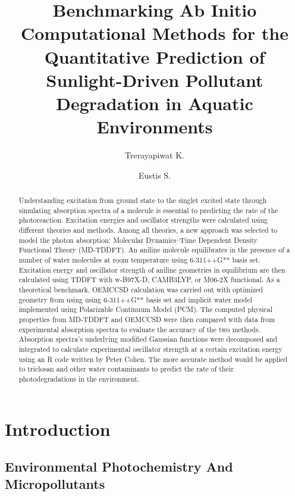 \documentclass[
journal=jpcbfk, %
manuscript=article]{achemso}
\author{Trerayapiwat K.}
\affiliation[Bowdoin College]
{Department of Chemistry, Bowdoin College, Brunswick, ME}
\author{Eustis S.}
\affiliation[Bowdoin College]
{Department of Chemistry, Bowdoin College, Brunswick, ME}
\title[\texttt{achemso} demonstration]
{Benchmarking Ab Initio Computational Methods for the Quantitative Prediction of Sunlight-Driven Pollutant Degradation in Aquatic Environments}
\begin{document}
\begin{abstract}
Understanding excitation from ground state to the singlet excited state through simulating absorption spectra of a molecule is essential to predicting the rate of the photoreaction. Excitation energies and oscillator strengths were calculated using different theories and methods. Among all theories, a new approach was selected to model the photon absorption: Molecular Dynamics–Time Dependent Density Functional Theory (MD-TDDFT). An aniline molecule equilibrates in the presence of a number of water molecules at room temperature using 6-311++G** basis set. Excitation energy and oscillator strength of aniline geometries in equilibrium are then calculated using TDDFT with w-B97X-D, CAMB3LYP, or M06-2X functional. As a theoretical benchmark, OEMCCSD calculation was carried out with optimized geometry from using using 6-311++G** basis set and implicit water model implemented using Polarizable Continuum Model (PCM). The computed physical properties from MD-TDDFT and OEMCCSD were then compared with data from experimental absorption spectra to evaluate the accuracy of the two methods. Absorption spectra’s underlying modified Gaussian functions were decomposed and integrated to calculate experimental oscillator strength at a certain excitation energy using an R code written by Peter Cohen. The more accurate method would be applied to triclosan and other water contaminants to predict the rate of their photodegradations in the environment.
\end{abstract}


\section{Introduction}

\subsection{Environmental Photochemistry And Micropollutants}
\end{document}
